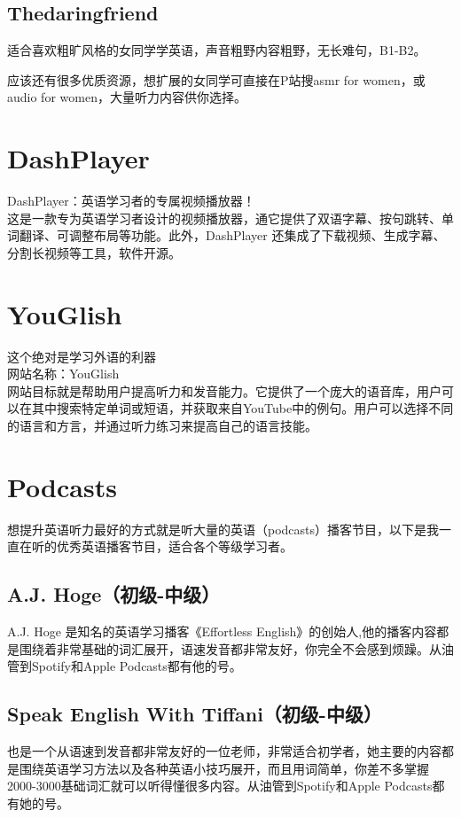 \documentclass[11pt]{article}
\begin{document}
\subsection{Thedaringfriend}
\label{sec:org7a288c2}
适合喜欢粗旷风格的女同学学英语，声音粗野内容粗野，无长难句，B1-B2。

应该还有很多优质资源，想扩展的女同学可直接在P站搜asmr for women，或audio for women，大量听力内容供你选择。

\section{DashPlayer}
\label{sec:org83d5536}
DashPlayer：英语学习者的专属视频播放器！\\
这是一款专为英语学习者设计的视频播放器，通它提供了双语字幕、按句跳转、单词翻译、可调整布局等功能。此外，DashPlayer 还集成了下载视频、生成字幕、分割长视频等工具，软件开源。

\section{YouGlish}
\label{sec:orga75046e}
这个绝对是学习外语的利器 \\
网站名称：YouGlish \\
网站目标就是帮助用户提高听力和发音能力。它提供了一个庞大的语音库，用户可以在其中搜索特定单词或短语，并获取来自YouTube中的例句。用户可以选择不同的语言和方言，并通过听力练习来提高自己的语言技能。\\


\section{Podcasts}
\label{sec:orgc53bff0}
想提升英语听力最好的方式就是听大量的英语（podcasts）播客节目，以下是我一直在听的优秀英语播客节目，适合各个等级学习者。

\subsection{A.J. Hoge（初级-中级）}
\label{sec:org78d07f1}
A.J. Hoge 是知名的英语学习播客《Effortless English》的创始人,他的播客内容都是围绕着非常基础的词汇展开，语速发音都非常友好，你完全不会感到烦躁。从油管到Spotify和Apple Podcasts都有他的号。
\subsection{Speak English With Tiffani（初级-中级）}
\label{sec:orgfd7d05a}
也是一个从语速到发音都非常友好的一位老师，非常适合初学者，她主要的内容都是围绕英语学习方法以及各种英语小技巧展开，而且用词简单，你差不多掌握2000-3000基础词汇就可以听得懂很多内容。从油管到Spotify和Apple Podcasts都有她的号。
\end{document}
